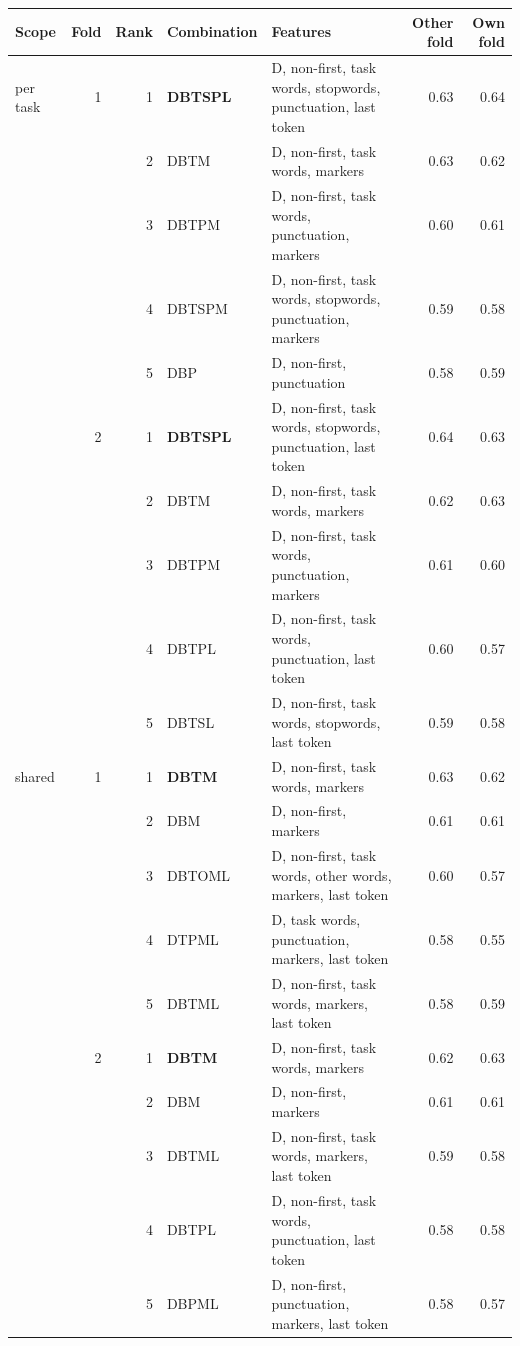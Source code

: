 \begin{tabular}{@{}lrrl>{\raggedright\arraybackslash}p{5.6cm}rr@{}}
\toprule
Scope & Fold & Rank & Combination & Features & Other fold & Own fold \\
\midrule
per task & 1 & 1 & \textbf{DBTSPL} & D, non-first, task words, stopwords, punctuation, last token & 0.63 & 0.64 \\
 &  & 2 & DBTM & D, non-first, task words, markers & 0.63 & 0.62 \\
 &  & 3 & DBTPM & D, non-first, task words, punctuation, markers & 0.60 & 0.61 \\
 &  & 4 & DBTSPM & D, non-first, task words, stopwords, punctuation, markers & 0.59 & 0.58 \\
 &  & 5 & DBP & D, non-first, punctuation & 0.58 & 0.59 \\
\addlinespace
 & 2 & 1 & \textbf{DBTSPL} & D, non-first, task words, stopwords, punctuation, last token & 0.64 & 0.63 \\
 &  & 2 & DBTM & D, non-first, task words, markers & 0.62 & 0.63 \\
 &  & 3 & DBTPM & D, non-first, task words, punctuation, markers & 0.61 & 0.60 \\
 &  & 4 & DBTPL & D, non-first, task words, punctuation, last token & 0.60 & 0.57 \\
 &  & 5 & DBTSL & D, non-first, task words, stopwords, last token & 0.59 & 0.58 \\
\midrule
shared & 1 & 1 & \textbf{DBTM} & D, non-first, task words, markers & 0.63 & 0.62 \\
 &  & 2 & DBM & D, non-first, markers & 0.61 & 0.61 \\
 &  & 3 & DBTOML & D, non-first, task words, other words, markers, last token & 0.60 & 0.57 \\
 &  & 4 & DTPML & D, task words, punctuation, markers, last token & 0.58 & 0.55 \\
 &  & 5 & DBTML & D, non-first, task words, markers, last token & 0.58 & 0.59 \\
\addlinespace
 & 2 & 1 & \textbf{DBTM} & D, non-first, task words, markers & 0.62 & 0.63 \\
 &  & 2 & DBM & D, non-first, markers & 0.61 & 0.61 \\
 &  & 3 & DBTML & D, non-first, task words, markers, last token & 0.59 & 0.58 \\
 &  & 4 & DBTPL & D, non-first, task words, punctuation, last token & 0.58 & 0.58 \\
 &  & 5 & DBPML & D, non-first, punctuation, markers, last token & 0.58 & 0.57 \\
\bottomrule
\end{tabular}
